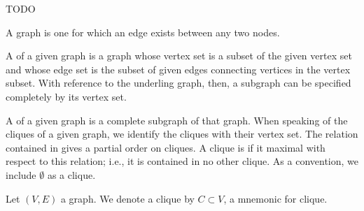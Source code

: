 
TODO


A
graph is one
for which an edge exists
between any two nodes.

A
of a given graph
is a graph whose
vertex set is a subset
of the given vertex set
and whose edge set is the
subset of given edges connecting
vertices in the vertex subset.
With reference to the underling
graph, then, a subgraph can be
specified completely by its
vertex set.

A 
of a given graph
is a complete subgraph
of that graph.
When speaking of the cliques
of a given graph, we identify
the cliques with their vertex
set.
The relation contained in
gives a partial order on
cliques.
A clique is
if it maximal with
respect to this relation;
i.e., it is contained
in no other clique.
As a convention, we include
$\emptyset$ as a clique.


Let $(V, E)$ a graph.
We denote a clique
by $C \subset V$,
a mnemonic for clique.
